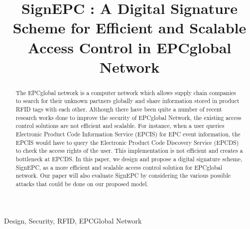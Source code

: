 \documentclass[conference]{IEEEtran}
\begin{document}
\title{SignEPC : A Digital Signature Scheme for Efficient and Scalable Access Control in EPCglobal Network}

\author{
\and
{}
}


\maketitle
\begin{abstract}
The EPCglobal network is a computer network which allows supply chain companies to search for their unknown partners globally and share information stored in product RFID tags with each other. Although there have been quite a number of recent research works done to improve the security of EPCglobal Network, the existing access control solutions are not efficient and scalable. For instance, when a user queries Electronic Product Code Information Service (EPCIS) for EPC event information, the EPCIS would have to query the Electronic Product Code Discovery Service (EPCDS) to check the access rights of the user. This implementation is not efficient and creates a bottleneck at EPCDS. In this paper, we design and propose a digital signature scheme, SignEPC, as a more efficient and scalable access control solution for EPCglobal network. Our paper will also evaluate SignEPC by considering the various possible attacks that could be done on our proposed model.

\end{abstract}

\begin{IEEEkeywords}
Design, Security, RFID, EPCGlobal Network
\end{IEEEkeywords}
\end{document}
